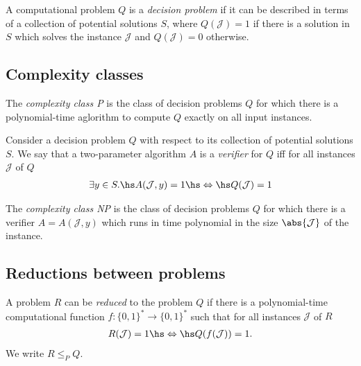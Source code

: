 \documentclass{article}
\begin{document}
\begin{definition}
	A computational problem $Q$ is a \emph{decision problem} if
	it can be described in terms of a collection of potential
	solutions $S$, where $Q(\mathcal{J})=1$ if there is a solution
	in $S$ which solves the instance $\mathcal{J}$ and $Q(\mathcal{J})=0$
	otherwise.
\end{definition}

\subsection{Complexity classes}

\begin{definition}
	The \emph{complexity class P} is the class of decision problems
	$Q$ for which there is a polynomial-time aglorithm to compute $Q$
	exactly on all input instances.
\end{definition}

\begin{definition}
	Consider a decision problem $Q$ with respect to its collection
	of potential solutions $S$. We say that a two-parameter algorithm 
	$A$ is a \emph{verifier} for $Q$ iff for all instances
	$\mathcal{J}$ of $Q$
	\begin{align*}
		\exists y\in S.\hs A(\mathcal{J},y)=1\hs\Leftrightarrow\hs Q(\mathcal{J})=1
	\end{align*}
\end{definition}

\begin{definition}
	The \emph{complexity class NP} is the class of decision problems $Q$
	for which there is a verifier $A=A(\mathcal{J}, y)$ which runs in time
	polynomial in the size $\abs{\mathcal{J}}$ of the instance.
\end{definition}

\subsection{Reductions between problems}

\begin{definition}
	A problem $R$ can be \emph{reduced} to the problem $Q$ if there
	is a polynomial-time computational function $f:\{0,1\}^*\to\{0,1\}^*$
	such that for all instances $\mathcal{J}$ of $R$
	\begin{align*}
		R(\mathcal{J})=1 \hs\Leftrightarrow\hs Q(f(\mathcal{J}))=1.
	\end{align*}
	We write $R\leq_P Q$.
\end{definition}
\end{document}
